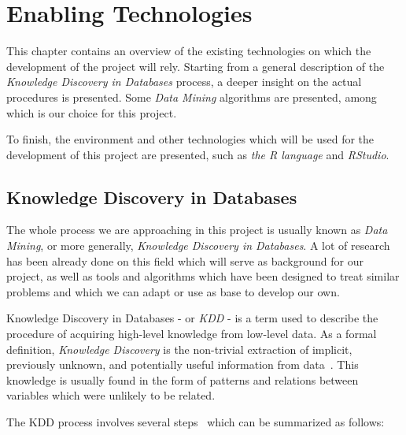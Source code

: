 \chapter{Enabling Technologies}
\label{chap:enabling_technologies}
\begin{chapterintro}
This chapter contains an overview of the existing technologies on which the development of the project will rely. Starting from a general description of the \emph{Knowledge Discovery in Databases} process, a deeper insight on the actual procedures is presented. Some \emph{Data Mining} algorithms are presented, among which is our choice for this project.

To finish, the environment and other technologies which will be used for the development of this project are presented, such as \emph{the R language} and \emph{RStudio}.
\end{chapterintro}

\section{Knowledge Discovery in Databases}
\label{sec:kdd}
The whole process we are approaching in this project is usually known as \emph{Data Mining}, or more generally, \emph{Knowledge Discovery in Databases}. A lot of research has been already done on this field which will serve as background for our project, as well as tools and algorithms which have been designed to treat similar problems and which we can adapt or use as base to develop our own\cite{chen1996data, fayyad1996kdd}.

Knowledge Discovery in Databases - or \emph{KDD} - is a term used to describe the procedure of acquiring high-level knowledge from low-level data. As a formal definition, \emph{Knowledge Discovery} is the non-trivial extraction of implicit, previously unknown, and potentially useful information from data~\cite{frawley1992knowledge}. This knowledge is usually found in the form of patterns and relations between variables which were unlikely to be related.

The KDD process involves several steps~\cite{feyyad1996data} which can be summarized as follows:

